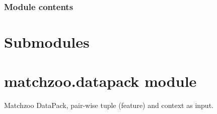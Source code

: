 \documentclass[letterpaper,10pt,english]{sphinxmanual}
\begin{document}
\subsubsection{Module contents}
\label{\detokenize{matchzoo.tasks:module-matchzoo.tasks}}\label{\detokenize{matchzoo.tasks:module-contents}}

\section{Submodules}
\label{\detokenize{matchzoo:submodules}}

\section{matchzoo.datapack module}
\label{\detokenize{matchzoo:matchzoo-datapack-module}}\label{\detokenize{matchzoo:module-matchzoo.datapack}}
Matchzoo DataPack, pair-wise tuple (feature) and context as input.
\end{document}
